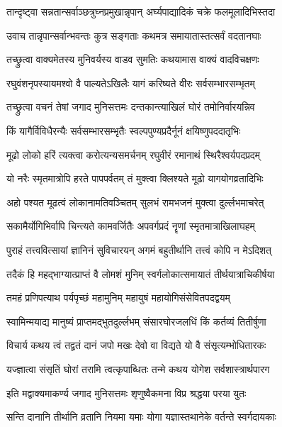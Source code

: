 \twolineshloka
{तान्दृष्ट्वा सन्नतान्सर्वाञ्छत्रुघ्नप्रमुखान्नृपान्}
{अर्घ्यपाद्यादिकं चक्रे फलमूलादिभिस्तदा}%

\twolineshloka
{उवाच तान्नृपान्सर्वान्भवन्तः कुत्र सङ्गताः}
{कथमत्र समायातास्तत्सर्वं वदतानघाः}%

\twolineshloka
{तच्छ्रुत्वा वाक्यमेतस्य मुनिवर्यस्य वाडव}
{सुमतिः कथयामास वाक्यं वादविचक्षणः}%


\twolineshloka
{रघुवंशनृपस्यायमश्वो वै पाल्यतेऽखिलैः}
{यागं करिष्यते वीरः सर्वसम्भारसम्भृतम्}%

\twolineshloka
{तच्छ्रुत्वा वचनं तेषां जगाद मुनिसत्तमः}
{दन्तकान्त्याखिलं घोरं तमोनिर्वारयन्निव}%


\twolineshloka
{किं यागैर्विविधैरन्यैः सर्वसम्भारसम्भृतैः}
{स्वल्पपुण्यप्रदैर्नूनं क्षयिष्णुपददातृभिः}%

\twolineshloka
{मूढो लोको हरिं त्यक्त्वा करोत्यन्यसमर्चनम्}
{रघुवीरं रमानाथं स्थिरैश्वर्यपदप्रदम्}%

\twolineshloka
{यो नरैः स्मृतमात्रोपि हरते पापपर्वतम्}
{तं मुक्त्वा क्लिश्यते मूढो यागयोगव्रतादिभिः}%

\twolineshloka
{अहो पश्यत मूढत्वं लोकानामतिवञ्चितम्}
{सुलभं रामभजनं मुक्त्वा दुर्ल्लभमाचरेत्}%

\twolineshloka
{सकामैर्योगिभिर्वापि चिन्त्यते कामवर्जितैः}
{अपवर्गप्रदं नॄणां स्मृतमात्राखिलाघहम्}%

\twolineshloka
{पुराहं तत्त्ववित्सायां ज्ञानिनं सुविचारयन्}
{अगमं बहुतीर्थानि तत्त्वं कोपि न मेऽदिशत्}%

\twolineshloka
{तदैकं हि महद्भाग्यात्प्राप्तं वै लोमशं मुनिम्}
{स्वर्गलोकात्समायातं तीर्थयात्राचिकीर्षया}%

\twolineshloka
{तमहं प्रणिपत्याथ पर्यपृच्छं महामुनिम्}
{महायुषं महायोगिसंसेवितपदद्वयम्}%

\twolineshloka
{स्वामिन्मयाद्य मानुष्यं प्राप्तमद्भुतदुर्ल्लभम्}
{संसारघोरजलधिं किं कर्तव्यं तितीर्षुणा}%

\twolineshloka
{विचार्य कथय त्वं तद्व्रतं दानं जपो मखः}
{देवो वा विद्यते यो वै संसृत्यम्भोधितारकः}%

\twolineshloka
{यज्ज्ञात्वा संसृतिं घोरां तरामि त्वत्कृपाब्धितः}
{तन्मे कथय योगेश सर्वशास्त्रार्थपारग}%

\twolineshloka
{इति मद्वाक्यमाकर्ण्य जगाद मुनिसत्तमः}
{शृणुष्वैकमना विप्र श्रद्धया परया युतः}%

\twolineshloka
{सन्ति दानानि तीर्थानि व्रतानि नियमा यमाः}
{योगा यज्ञास्तथानेके वर्तन्ते स्वर्गदायकाः}%

